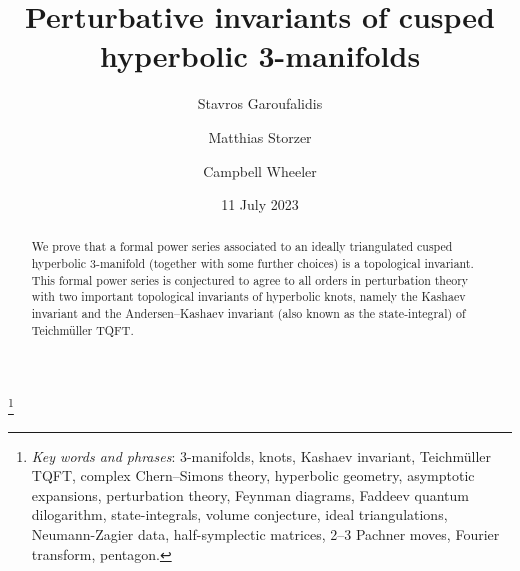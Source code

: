 \documentclass[12pt,reqno]{amsart}
\theoremstyle{definition}
\renewcommand{\=}{\;=\;}
\begin{document}
\title[Perturbative invariants of cusped hyperbolic 3-manifolds]{
  Perturbative invariants of cusped hyperbolic 3-manifolds}

\author{Stavros Garoufalidis}
\address{%
  International Center for Mathematics, Department of Mathematics \\
  Southern University of Science and Technology \\
  Shenzhen, China \newline
  {\tt \url{http://people.mpim-bonn.mpg.de/stavros}}}
\author{Matthias Storzer}
\address{Max Planck Institute for Mathematics \\
         Vivatsgasse 7, 53111 Bonn, Germany \newline
         {\tt \url{http://guests.mpim-bonn.mpg.de/storzer}}}
\author{Campbell Wheeler}
\address{Max Planck Institute for Mathematics \\
         Vivatsgasse 7, 53111 Bonn, Germany \newline
         {\tt \url{http://guests.mpim-bonn.mpg.de/cjwh}}}
\thanks{
  {\em Key words and phrases}: 3-manifolds, knots, Kashaev invariant, 
  Teichm\"uller TQFT, complex Chern--Simons theory, hyperbolic geometry, 
  asymptotic expansions, perturbation theory, Feynman diagrams,
  Faddeev quantum dilogarithm,
  state-integrals, volume conjecture, ideal triangulations, Neumann-Zagier data,
  half-symplectic matrices, 2--3 Pachner moves, Fourier transform, pentagon. 
}

\date{11 July 2023}%

\begin{abstract}
  We prove that a formal power series associated to an ideally triangulated cusped
  hyperbolic 3-manifold (together with some further choices) is a topological
  invariant. This formal power series is conjectured to agree to
  all orders in perturbation theory with two important topological invariants of
  hyperbolic knots, namely the Kashaev invariant and the Andersen--Kashaev
  invariant (also known as the state-integral) of Teichm\"uller TQFT.
\end{abstract}
\end{document}
